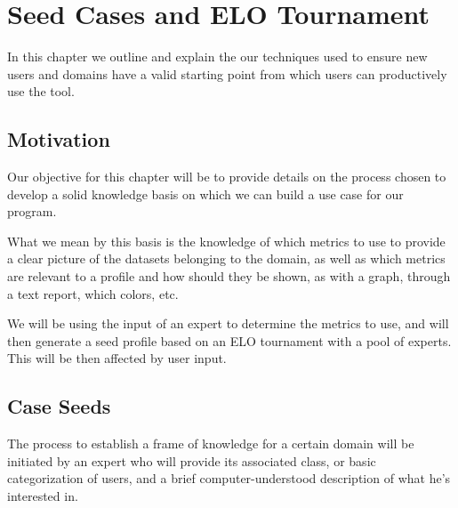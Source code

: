 %
%

\chapter{Seed Cases and ELO Tournament}

\begin{resumen}
In this chapter we outline and explain the our techniques used to ensure new users and domains have a valid starting point from which users can productively use the tool.
\end{resumen}

\linespread{1.6}

\section{Motivation}
\label{cap4:sec:motivation}

Our objective for this chapter will be to provide details on the process chosen to develop a solid knowledge basis on which we can build a use case for our program.

What we mean by this basis is the knowledge of which metrics to use to provide a clear picture of the datasets belonging to the domain, as well as which metrics are relevant to a profile and how should they be shown, as with a graph, through a text report, which colors, etc.

We will be using the input of an expert to determine the metrics to use, and will then generate a seed profile based on an ELO tournament with a pool of experts. This will be then affected by user input.

\section{Case Seeds}
\label{cap4:sec:metricseeds}

The process to establish a frame of knowledge for a certain domain will be initiated by an expert who will provide its associated class, 
or basic categorization of users, and a brief computer-understood description of what he's interested in.

